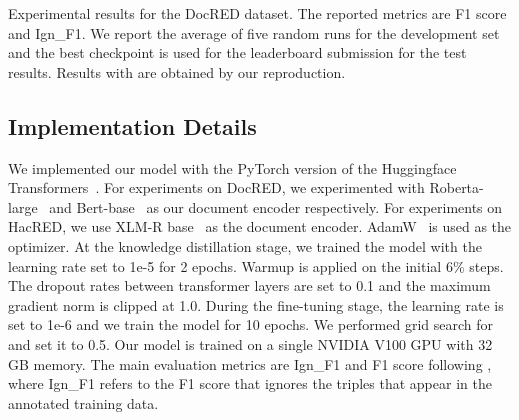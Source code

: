 \documentclass[11pt]{article}
\begin{document}
\begin{table*}
\caption{Experimental results for the DocRED dataset. The reported metrics are F1 score and Ign\_F1. We report the average of five random runs for the development set and the best checkpoint is used for the leaderboard submission for the test results. Results with  are obtained by our reproduction.}
\label{tab:docred}
\end{table*}


\subsection{Implementation Details}
We implemented our model with the PyTorch version of the Huggingface Transformers~\citep{wolf2020transformers}. For experiments on DocRED, we experimented with Roberta-large~\citep{liu2019roberta} and Bert-base~\citep{devlin-etal-2019-bert} as our document encoder respectively. For experiments on HacRED, we use XLM-R base~\citep{conneau-etal-2020-unsupervised} as the document encoder. AdamW~\citep{loshchilov2018decoupled} is used as the optimizer. At the knowledge distillation stage, we trained the model with the learning rate set to 1e-5 for 2 epochs. Warmup is applied on the initial 6\% steps. The dropout rates between transformer layers are set to 0.1 and the maximum gradient norm is clipped at 1.0. During the fine-tuning stage, the learning rate is set to 1e-6 and we train the model for 10 epochs. We performed grid search for  and set it to 0.5. Our model is trained on a single NVIDIA V100 GPU with 32 GB memory. The main evaluation metrics are Ign\_F1 and F1 score following \citet{yao2019docred}, where Ign\_F1 refers to the F1 score that ignores the triples that appear in the annotated training data.
\end{document}
